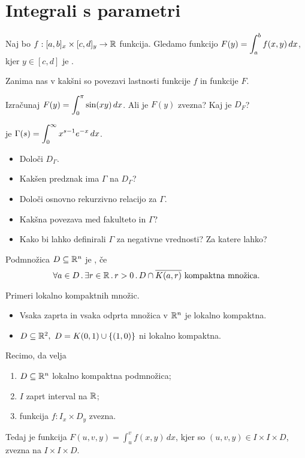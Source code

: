 \section{Integrali s parametri}
Naj bo $f:[a,b]_x \times [c,d]_y \to \mathbb{R}$ funkcija. Gledamo funkcijo $\displaystyle F(y) = \int_{a}^{b}f(x,y) \, dx$, kjer $y \in [c,d]$ je .

Zanima nas v kakšni so povezavi lastnosti funkcije $f$ in funkcije $F$.

\begin{zgled}
    Izračunaj $\displaystyle F(y) = \int_{0}^{\pi} \sin (xy) \,dx$. Ali je $F(y)$ zvezna? Kaj je $D_F$?
\end{zgled}

\begin{zgled}
     je $\displaystyle \Gamma (s) = \int_{0}^{\infty} x^{s-1} e^{-x} \, dx$.
    \begin{itemize}
        \item Določi $D_\Gamma$.
        \item Kakšen predznak ima $\Gamma$ na $D_\Gamma$?
        \item Določi osnovno rekurzivno relacijo za $\Gamma$.
        \item Kakšna povezava med fakulteto in $\Gamma$?
        \item Kako bi lahko definirali $\Gamma$ za negativne vrednosti? Za katere lahko?
    \end{itemize}
\end{zgled}

\begin{definicija}
    Podmnožica $D \subseteq \mathbb{R}^n$ je , če
    $$\forall a \in D \,.\, \exists r \in \mathbb{R} \, . \, r > 0 \,.\, D \cap \overline{K(a,r)} \text{ kompaktna množica}.$$
\end{definicija}

\begin{zgled}
    Primeri lokalno kompaktnih množic.
    \begin{itemize}
        \item Vsaka zaprta in vsaka odprta množica v $\mathbb{R}^n$ je lokalno kompaktna.
        \item $D \subseteq \mathbb{R}^2, \ D = K(0,1) \cup \left\{(1,0)\right\}$ ni lokalno kompaktna.
    \end{itemize}
\end{zgled}

\begin{trditev}
    Recimo, da velja
    \begin{enumerate}
        \item $D \subseteq \mathbb{R}^n$ lokalno kompaktna podmnožica;
        \item $I$ zaprt interval na $\mathbb{R}$;
        \item funkcija $f: I_x \times D_y$ zvezna.
    \end{enumerate}
    Tedaj je funkcija $\displaystyle F(u, v, y) = \int_{u}^{v}f(x,y) \, dx$, kjer so $(u, v, y) \in I \times I \times D$, zvezna na $I \times I \times D$.
\end{trditev}


